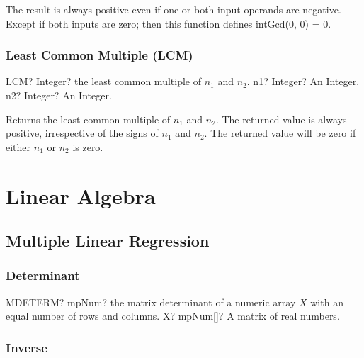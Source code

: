 \vspace{0.3cm}
The result is always positive even if
one or both input operands are negative. Except if both inputs are zero; then this function
defines \textsf{intGcd}(0, 0) = 0.



\subsection{Least Common Multiple (LCM)}


\vspace{0.6cm}
\begin{mpFunctionsExtract}
	\mpWorksheetFunctionTwoNotImplemented
	{LCM? Integer? the least common multiple of $n_1$ and $n_2$.}
	{n1? Integer? An Integer.}
	{n2? Integer? An Integer.}
\end{mpFunctionsExtract}

\vspace{0.3cm}
Returns the least common multiple of $n_1$ and $n_2$. The returned value is always positive, irrespective of the signs of $n_1$ and $n_2$. The returned value  will be zero if either $n_1$ or $n_2$ is zero.




\chapter{Linear Algebra}

\section{Multiple Linear Regression}



\subsection{Determinant}

\begin{mpFunctionsExtract}
	\mpWorksheetFunctionOneNotImplemented
	{MDETERM? mpNum? the matrix determinant of a numeric array $X$ with an equal number of rows and columns.}
	{X? mpNum[]? A matrix of real numbers.}
\end{mpFunctionsExtract}





\subsection{Inverse}

